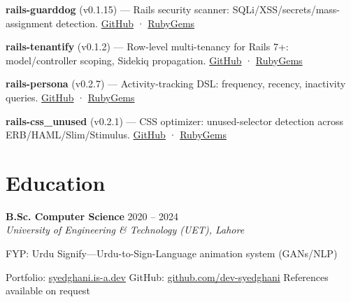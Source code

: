 \documentclass[10pt,a4paper]{article}
\newcommand{\jobtitle}[3]{
  {\normalsize\bfseries\color{headerblue}#1} \hfill {\small\color{subtle}#3}\\
  {\small\color{subtle}\textit{#2}}
}
\begin{document}
{\footnotesize
\noindent\textbf{\color{headerblue}rails-guarddog} (v0.1.15) — Rails security scanner: SQLi/XSS/secrets/mass-assignment detection. \href{https://github.com/dev-syedghani/rails-guarddog}{GitHub} · \href{https://rubygems.org/gems/rails-guarddog}{RubyGems}

\vspace{1pt}
\noindent\textbf{\color{headerblue}rails-tenantify} (v0.1.2) — Row-level multi-tenancy for Rails 7+: model/controller scoping, Sidekiq propagation. \href{https://github.com/dev-syedghani/rails-tenantify}{GitHub} · \href{https://rubygems.org/gems/rails-tenantify}{RubyGems}

\vspace{1pt}
\noindent\textbf{\color{headerblue}rails-persona} (v0.2.7) — Activity-tracking DSL: frequency, recency, inactivity queries. \href{https://github.com/dev-syedghani/rails-persona}{GitHub} · \href{https://rubygems.org/gems/rails-persona}{RubyGems}

\vspace{1pt}
\noindent\textbf{\color{headerblue}rails-css\_unused} (v0.2.1) — CSS optimizer: unused-selector detection across ERB/HAML/Slim/Stimulus. \href{https://github.com/dev-syedghani/rails-css_unused}{GitHub} · \href{https://rubygems.org/gems/rails-css_unused}{RubyGems}

\vspace{2pt}
}

\section{Education}

\jobtitle{B.Sc. Computer Science}{University of Engineering \& Technology (UET), Lahore}{2020 -- 2024}
\vspace{1pt}
{\small\color{subtle}FYP: Urdu Signify—Urdu-to-Sign-Language animation system (GANs/NLP)}

\vspace{1pt}
{\footnotesize\color{subtle}\centering
  Portfolio: \href{https://syedghani.is-a.dev}{syedghani.is-a.dev}
  \quad\textbullet\quad
  GitHub: \href{https://github.com/dev-syedghani}{github.com/dev-syedghani}
  \quad\textbullet\quad
  References available on request
}
\end{document}
